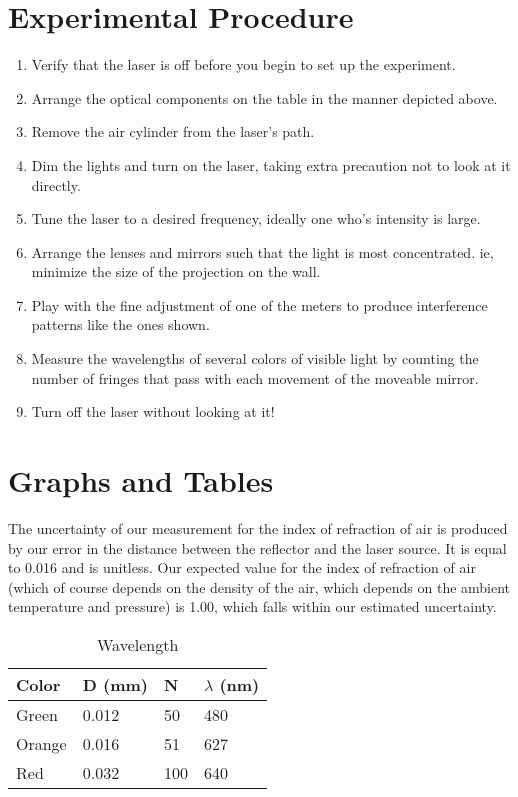 \documentclass{amsart}
\begin{document}
\section{Experimental Procedure}
\begin{enumerate}
\item Verify that the laser is off before you begin to set up the experiment.
\item Arrange the optical components on the table in the manner depicted above.
\item Remove the air cylinder from the laser's path.
\item Dim the lights and turn on the laser, taking extra precaution not to look at it directly.
\item Tune the laser to a desired frequency, ideally one who's intensity is large.
\item Arrange the lenses and mirrors such that the light is most concentrated. ie, minimize the size of the projection on the wall.
\item Play with the fine adjustment of one of the meters to produce interference patterns like the ones shown.
\item Measure the wavelengths of several colors of visible light by counting the number of fringes that pass with each movement of the moveable mirror.
\item Turn off the laser without looking at it!
\end{enumerate}
\vfill
\section{Graphs and Tables}

The uncertainty of our measurement for the index of refraction of air is produced by our error in the distance between the reflector and the laser source. It is equal to 0.016 and is unitless. Our expected value for the index of refraction of air (which of course depends on the density of the air, which depends on the ambient temperature and pressure) is 1.00, which falls within our estimated uncertainty.

\begin{table}[H]
    \centering
    \caption{Wavelength}
    \label{my-label}
    \begin{tabular}{@{}llll@{}}\toprule
        Color  & D (mm) & N   & $\lambda$ (nm)      \\ \midrule
        Green  & 0.012  & 50  & 480         \\
        Orange & 0.016  & 51  & 627 \\
        Red    & 0.032  & 100 & 640 \\
        \bottomrule
    \end{tabular}
\end{table}
\end{document}
